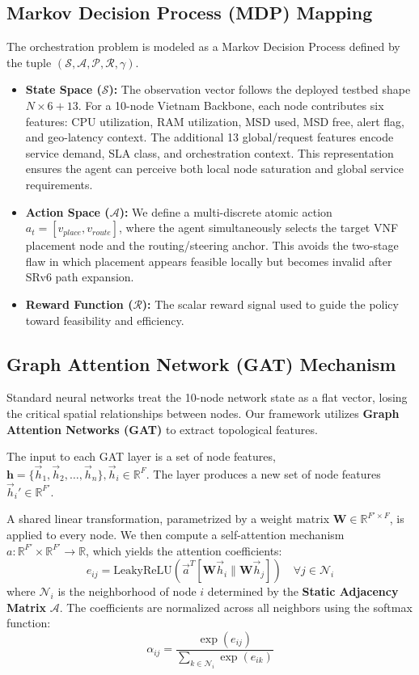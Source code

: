 \documentclass[12pt, a4paper, reqno, oneside]{book}
\begin{document}
\subsection{Markov Decision Process (MDP) Mapping}
The orchestration problem is modeled as a Markov Decision Process defined by the tuple $(\mathcal{S}, \mathcal{A}, \mathcal{P}, \mathcal{R}, \gamma)$.

\begin{itemize}
    \item \textbf{State Space ($\mathcal{S}$):} The observation vector follows the deployed testbed shape $N \times 6 + 13$. For a 10-node Vietnam Backbone, each node contributes six features: CPU utilization, RAM utilization, MSD used, MSD free, alert flag, and geo-latency context. The additional 13 global/request features encode service demand, SLA class, and orchestration context. This representation ensures the agent can perceive both local node saturation and global service requirements.
    \item \textbf{Action Space ($\mathcal{A}$):} We define a multi-discrete atomic action $a_t = [v_{place}, v_{route}]$, where the agent simultaneously selects the target VNF placement node and the routing/steering anchor. This avoids the two-stage flaw in which placement appears feasible locally but becomes invalid after SRv6 path expansion.
    \item \textbf{Reward Function ($\mathcal{R}$):} The scalar reward signal used to guide the policy toward feasibility and efficiency.
\end{itemize}

\subsection{Graph Attention Network (GAT) Mechanism}
Standard neural networks treat the 10-node network state as a flat vector, losing the critical spatial relationships between nodes. Our framework utilizes \textbf{Graph Attention Networks (GAT)} \cite{velivckovic2017graph} to extract topological features.

The input to each GAT layer is a set of node features, $\mathbf{h} = \{\vec{h}_1, \vec{h}_2, \dots, \vec{h}_n\}, \vec{h}_i \in \mathbb{R}^F$. The layer produces a new set of node features $\vec{h}_i' \in \mathbb{R}^{F'}$. 

A shared linear transformation, parametrized by a weight matrix $\mathbf{W} \in \mathbb{R}^{F' \times F}$, is applied to every node. We then compute a self-attention mechanism $a: \mathbb{R}^{F'} \times \mathbb{R}^{F'} \to \mathbb{R}$, which yields the attention coefficients:
\begin{equation}
e_{ij} = \text{LeakyReLU}\left(\vec{a}^T [\mathbf{W}\vec{h}_i \parallel \mathbf{W}\vec{h}_j]\right)
\quad \forall j \in \mathcal{N}_i
\end{equation}
where $\mathcal{N}_i$ is the neighborhood of node $i$ determined by the \textbf{Static Adjacency Matrix} $\mathcal{A}$. The coefficients are normalized across all neighbors using the softmax function:
\begin{equation}
\alpha_{ij} = \frac{\exp(e_{ij})}{\sum_{k \in \mathcal{N}_i} \exp(e_{ik})}
\end{equation}
\end{document}
